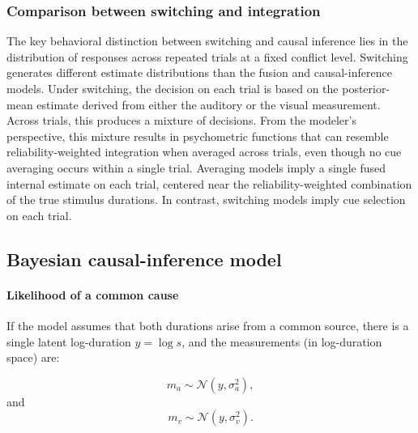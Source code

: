 \documentclass{biorxiv}
\begin{document}

\subsubsection{Comparison between switching and integration}
The key behavioral distinction between switching and causal inference lies in the distribution of responses across repeated trials at a fixed conflict level. Switching generates different estimate distributions than the fusion and causal-inference models. Under switching, the decision on each trial is based on the posterior-mean estimate derived from either the auditory or the visual measurement. Across trials, this produces a mixture of decisions. From the modeler's perspective, this mixture results in psychometric functions that can resemble reliability-weighted integration when averaged across trials, even though no cue averaging occurs within a single trial. Averaging models imply a single fused internal estimate on each trial, centered near the reliability-weighted combination of the true stimulus durations. In contrast, switching models imply cue selection on each trial.

\subsection{Bayesian causal-inference model}\label{causal_inf_equations}

\paragraph{Likelihood of a common cause}

If the model assumes that both durations arise from a common source, there is a single latent log-duration $y = \log s$, and the measurements (in log-duration space) are:

\begin{equation}
\label{eq:ma_given_y}
m_a \sim \mathcal{N}(y, \sigma_a^2),
\end{equation}
and
\begin{equation}
\label{eq:mv_given_y}
m_v \sim \mathcal{N}(y, \sigma_v^2).
\end{equation}
\end{document}
